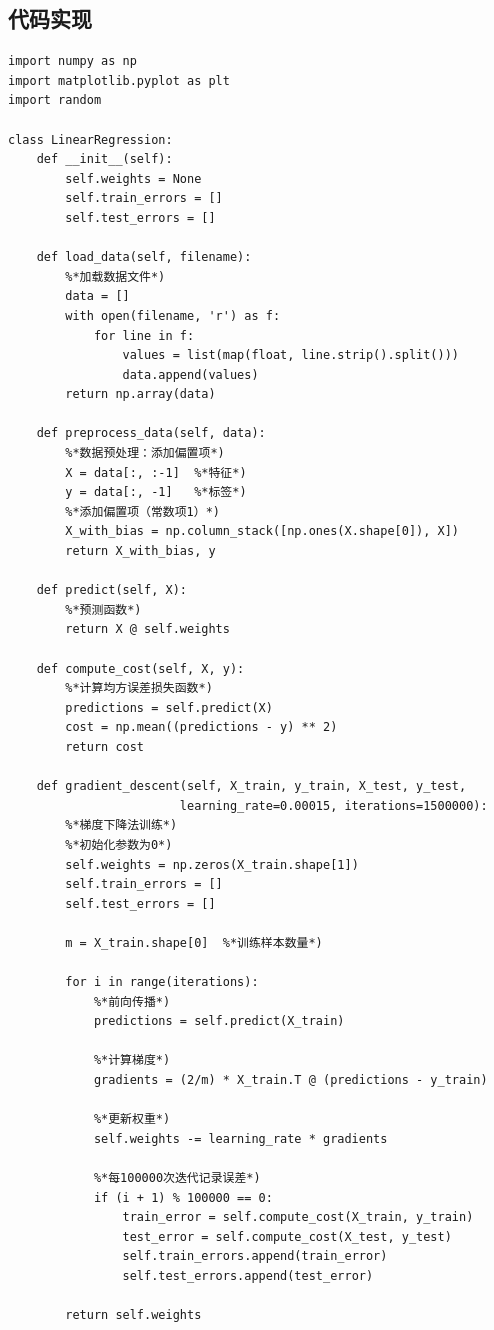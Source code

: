 \documentclass[a4paper]{article}
\begin{document}
\subsection{代码实现}
\begin{lstlisting}[caption=线性回归实现代码]
import numpy as np
import matplotlib.pyplot as plt
import random

class LinearRegression:
    def __init__(self):
        self.weights = None
        self.train_errors = []
        self.test_errors = []
        
    def load_data(self, filename):
        %*加载数据文件*)
        data = []
        with open(filename, 'r') as f:
            for line in f:
                values = list(map(float, line.strip().split()))
                data.append(values)
        return np.array(data)
    
    def preprocess_data(self, data):
        %*数据预处理：添加偏置项*)
        X = data[:, :-1]  %*特征*)
        y = data[:, -1]   %*标签*)
        %*添加偏置项（常数项1）*)
        X_with_bias = np.column_stack([np.ones(X.shape[0]), X])
        return X_with_bias, y
    
    def predict(self, X):
        %*预测函数*)
        return X @ self.weights
    
    def compute_cost(self, X, y):
        %*计算均方误差损失函数*)
        predictions = self.predict(X)
        cost = np.mean((predictions - y) ** 2)
        return cost
    
    def gradient_descent(self, X_train, y_train, X_test, y_test, 
                        learning_rate=0.00015, iterations=1500000):
        %*梯度下降法训练*)
        %*初始化参数为0*)
        self.weights = np.zeros(X_train.shape[1])
        self.train_errors = []
        self.test_errors = []
        
        m = X_train.shape[0]  %*训练样本数量*)
        
        for i in range(iterations):
            %*前向传播*)
            predictions = self.predict(X_train)
            
            %*计算梯度*)
            gradients = (2/m) * X_train.T @ (predictions - y_train)
            
            %*更新权重*)
            self.weights -= learning_rate * gradients
            
            %*每100000次迭代记录误差*)
            if (i + 1) % 100000 == 0:
                train_error = self.compute_cost(X_train, y_train)
                test_error = self.compute_cost(X_test, y_test)
                self.train_errors.append(train_error)
                self.test_errors.append(test_error)
        
        return self.weights
\end{lstlisting}
\end{document}
